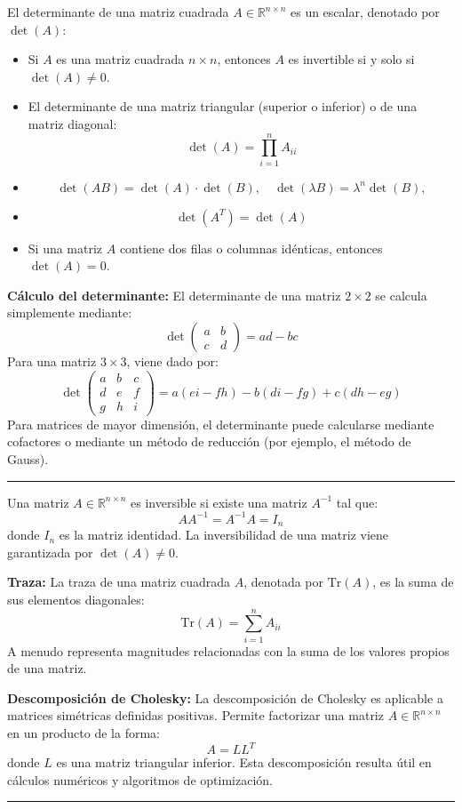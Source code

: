 \begin{f}
	
	El determinante de una matriz cuadrada \( A \in \mathbb{R}^{n \times n} \) es un escalar, denotado por \( \det(A) \):
	\begin {itemize}
	\item Si \( A \) es una matriz cuadrada \( n \times n \), entonces \( A \) es invertible si y solo si \( \det(A) \neq 0 \).
	\item El determinante de una matriz triangular (superior o inferior) o de una matriz diagonal:
	\[
	\det(A) = \prod_{i=1}^{n} A_{ii}
	\]
	\item
	\[
	\det(AB) = \det(A) \cdot \det(B),\quad \det(\lambda B) = \lambda^n\det(B), 
	\]
	\item 
	\[
	\det(A^T) = \det(A)
	\]
	\item Si una matriz \( A \) contiene dos filas o columnas idénticas, entonces \( \det(A) = 0 \).
\end{itemize}

\textbf{Cálculo del determinante:}
El determinante de una matriz \( 2 \times 2 \) se calcula simplemente mediante:
\[
\det\begin{pmatrix} a & b \\ c & d \end{pmatrix} = ad - bc
\]
Para una matriz \( 3 \times 3 \), viene dado por:
\[
\det\begin{pmatrix} a & b & c \\ d & e & f \\ g & h & i \end{pmatrix} = a(ei - fh) - b(di - fg) + c(dh - eg)
\]
Para matrices de mayor dimensión, el determinante puede calcularse mediante cofactores o mediante un método de reducción (por ejemplo, el método de Gauss).

\end{f}
\hrule
\begin{f} 
	Una matriz \( A \in \mathbb{R}^{n \times n} \) es inversible si existe una matriz \( A^{-1} \) tal que:
	\[
	A A^{-1} = A^{-1} A = I_n
	\]
	donde \( I_n \) es la matriz identidad. La inversibilidad de una matriz viene garantizada por \( \det(A) \neq 0 \).
	
	\textbf{Traza:}
	La traza de una matriz cuadrada \( A \), denotada por \( \text{Tr}(A) \), es la suma de sus elementos diagonales:
	\[
	\text{Tr}(A) = \sum_{i=1}^{n} A_{ii}
	\]
	A menudo representa magnitudes relacionadas con la suma de los valores propios de una matriz.
	
	\textbf{Descomposición de Cholesky:}
	La descomposición de Cholesky es aplicable a matrices simétricas definidas positivas. Permite factorizar una matriz \( A \in \mathbb{R}^{n \times n} \) en un producto de la forma:
	\[
	A = LL^T
	\]
	donde \( L \) es una matriz triangular inferior. Esta descomposición resulta útil en cálculos numéricos y algoritmos de optimización.
	
\end{f}
\hrule

